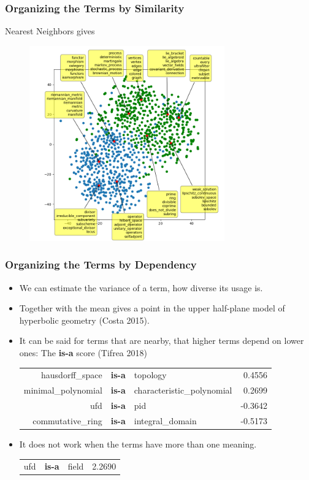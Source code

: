 \documentclass[10pt]{beamer}
\begin{document}
\begin{frame}
    \frametitle{Organizing the Terms by Similarity}
    Nearest Neighbors gives 
            \begin{figure}
                \centering
                \includegraphics[width=0.75\textwidth]{../Images/showcenters.png}
            \end{figure}
\end{frame}

\begin{frame}
    \frametitle{Organizing the Terms by Dependency}
    \begin{itemize}
        \item We can estimate the variance of a term, how diverse its usage is. \pause
        \item Together with the mean gives a point in the upper half-plane model of hyperbolic geometry (Costa 2015).
            \pause
        \item It can be said for terms that are nearby, that higher terms depend on lower ones: The \textbf{is-a} score (Tifrea 2018)
            \pause
            \begin{tabular}{rclr}
                \centering
hausdorff\_space & \textbf{is-a}  &   topology  &  0.4556 \\
minimal\_polynomial & \textbf{is-a} & characteristic\_polynomial  &  0.2699 \\
ufd   & \textbf{is-a}   &      pid &  -0.3642 \\
commutative\_ring & \textbf{is-a} & integral\_domain  & -0.5173 \\
\end{tabular}
\pause
\item It does not work when the terms have more than one meaning.
            \begin{tabular}{rclr}
                \centering
ufd  & \textbf{is-a}  & field  & 2.2690 \\
\end{tabular}
    \end{itemize}
\end{frame}
\end{document}
